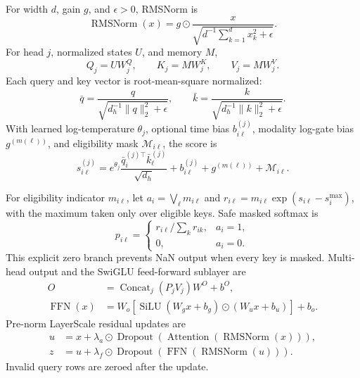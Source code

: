 \documentclass[10pt,letterpaper]{article}
\numberwithin{equation}{section}
\newcommand{\RMSNorm}{\operatorname{RMSNorm}}
\theoremstyle{definition}
\theoremstyle{remark}
\begin{document}
For width \(d\), gain \(g\), and \(\epsilon>0\), RMSNorm
\citep{zhang2019rms} is
\begin{equation}
\RMSNorm(x)=g\odot
\frac{x}{\sqrt{d^{-1}\sum_{k=1}^{d}x_k^2+\epsilon}}.
\label{eq:rmsnorm}
\end{equation}
For head \(j\), normalized states \(U\), and memory \(M\),
\begin{equation}
Q_j=UW_j^Q,\qquad K_j=MW_j^K,\qquad V_j=MW_j^V.
\label{eq:qkv}
\end{equation}
Each query and key vector is root-mean-square normalized:
\begin{equation}
\bar q=\frac{q}{\sqrt{d_h^{-1}\lVert q\rVert_2^2+\epsilon}},
\qquad
\bar k=\frac{k}{\sqrt{d_h^{-1}\lVert k\rVert_2^2+\epsilon}}.
\label{eq:qk-norm}
\end{equation}
With learned log-temperature \(\theta_j\), optional time bias
\(b_{i\ell}^{(j)}\), modality log-gate bias \(g^{(m(\ell))}\), and eligibility
mask \(\mathcal{M}_{i\ell}\), the score is
\begin{equation}
s_{i\ell}^{(j)}
=e^{\theta_j}\frac{\bar q_i^{(j)\top}\bar k_\ell^{(j)}}{\sqrt{d_h}}
+b_{i\ell}^{(j)}+g^{(m(\ell))}+\mathcal{M}_{i\ell}.
\label{eq:attention-score}
\end{equation}

For eligibility indicator \(m_{i\ell}\), let
\(a_i=\bigvee_\ell m_{i\ell}\) and
\(r_{i\ell}=m_{i\ell}\exp(s_{i\ell}-s_i^{\max})\), with the maximum taken
only over eligible keys. Safe masked softmax is
\begin{equation}
p_{i\ell}=
\begin{cases}
r_{i\ell}/\sum_k r_{ik},&a_i=1,\\
0,&a_i=0.
\end{cases}
\label{eq:safe-softmax}
\end{equation}
This explicit zero branch prevents NaN output when every key is masked.
Multi-head output and the SwiGLU feed-forward sublayer
\citep{shazeer2020} are
\begin{align}
O&=\operatorname{Concat}_j(P_jV_j)W^O+b^O, \label{eq:attention-output}\\
\operatorname{FFN}(x)
&=W_o\!\left[
\operatorname{SiLU}(W_gx+b_g)\odot(W_ux+b_u)
\right]+b_o. \label{eq:swiglu}
\end{align}
Pre-norm LayerScale residual updates are
\begin{align}
u&=x+\lambda_a\odot
\operatorname{Dropout}(\operatorname{Attention}(\RMSNorm(x))),\nonumber\\
z&=u+\lambda_f\odot
\operatorname{Dropout}(\operatorname{FFN}(\RMSNorm(u))).
\label{eq:residual}
\end{align}
Invalid query rows are zeroed after the update.
\end{document}
